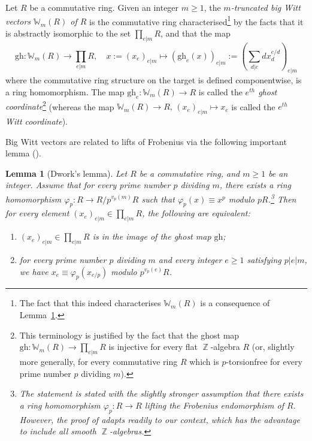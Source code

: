 \documentclass[10pt,twoside]{scrarticle}
\newlength{\len}
\newtheorem{lemma}[theorem]{Lemma}
\theoremstyle{definition}
\DeclareMathOperator{\Z}{\mathbb{Z}}
\newcommand{\W}{\mathbb{W}}
\newcommand{\Wm}{\mathbb{W}_m}
\newcommand{\gh}{\mathrm{gh}}
\renewcommand{\ge}{\geqslant}
\numberwithin{equation}{theorem}
\begin{document}
Let $R$ be a commutative ring. Given an integer $m \ge 1$, the \textit{$m$-truncated big Witt vectors $\Wm(R)$ of $R$} is the commutative ring characterised\footnote{The fact that this indeed characterises $\W_m(R)$ is a consequence of Lemma~\ref{lemmadwork}.} by the facts that it is abstractly isomorphic to the set $\prod_{e|m} R$, and that the map
$$\gh : \W_m(R) \longrightarrow \prod_{e|m}{R},\quad x := (x_e)_{e|m} \longmapsto (\mathrm{gh}_{e}(x))_{e|m}:=\left(\sum_{d|e}{dx_d^{e/d}}\right)_{e|m}$$
where the commutative ring structure on the target is defined componentwise, is a ring homomorphism. The map $\gh_e : \W_m(R) \rightarrow R$ is called the \emph{$e^{th}$ ghost coordinate}\footnote{This terminology is justified by the fact that the ghost map $\gh : \W_m(R) \rightarrow \prod_{e|m} R$ is injective for every flat $\Z$-algebra $R$ (or, slightly more generally, for every commutative ring $R$ which is $p$-torsionfree for every prime number $p$ dividing $m$).} (whereas the map $\W_m(R) \rightarrow R, \, (x_e)_{e|m} \mapsto x_e$ is called the \emph{$e^{th}$ Witt coordinate}).

Big Witt vectors are related to lifts of Frobenius via the following important lemma (\cite[Lemma~1.1]{hesselholt_deRham-Witt}). 

\begin{lemma}[Dwork's lemma]\label{lemmadwork}
    Let $R$ be a commutative ring, and $m \ge 1$ be an integer. Assume that for every prime number $p$ dividing $m$, there exists a ring homomorphism $\varphi_p : R \rightarrow R/p^{v_p(m)}R$ such that $\varphi_p(x) \equiv x^p$ modulo $pR$.\footnote{The statement \cite[Lemma~1.1]{hesselholt_deRham-Witt} is stated with the slightly stronger assumption that there exists a ring homomorphism $\varphi_p : R \rightarrow R$ lifting the Frobenius endomorphism of $R$. However, the proof of \cite[Lemma~1.1]{hesselholt_deRham-Witt} adapts readily to our context, which has the advantage to include all smooth $\Z$-algebras.} Then for every element $(x_e)_{e|m} \in \prod_{e|m} R$, the following are equivalent:
    \begin{enumerate}
        \item $(x_e)_{e|m} \in \prod_{e|m} R$ is in the image of the ghost map $\gh$;
        \item for every prime number $p$ dividing $m$ and every integer $e \ge 1$ satisfying $p | e |m$, we have $x_e \equiv \varphi_p(x_{e/p})$ modulo $p^{v_p(e)}R$.
    \end{enumerate}
\end{lemma}
\end{document}
